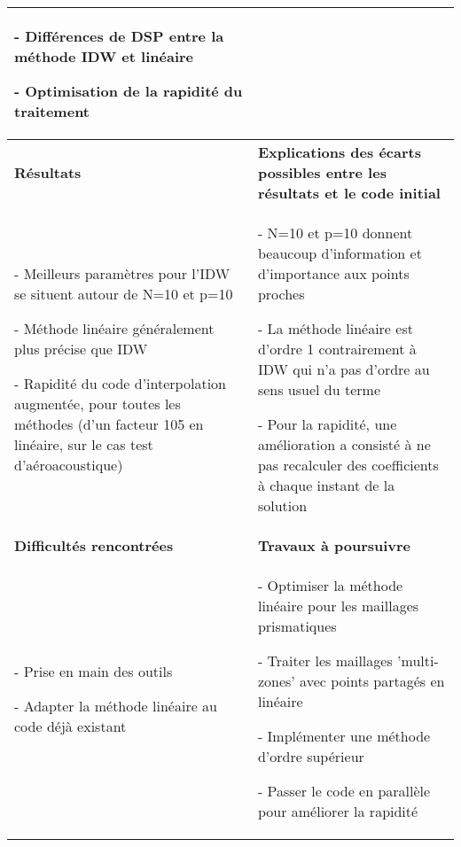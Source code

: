 \begin{table}[ht]
\begin{tabular}{|p{6.5cm}|p{8.5cm}|}
{\begin{minipage}[t]{14cm}
- Différences de DSP entre la méthode IDW et linéaire

- Optimisation de la rapidité du traitement
\hspace{0.5cm}
\end{minipage}
} \\ 
\hline
\textbf{Résultats} & \textbf{Explications des écarts possibles entre les résultats et le code initial} \\ 
\hline
\begin{minipage}[t]{6.5cm}

- Meilleurs paramètres pour l'IDW se situent autour de N=10 et p=10

- Méthode linéaire généralement plus précise que IDW

- Rapidité du code d'interpolation augmentée, pour toutes les méthodes (d'un facteur 105 en linéaire, sur le cas test d'aéroacoustique)

\end{minipage} & 
\begin{minipage}[t]{8.5cm}

- N=10 et p=10 donnent beaucoup d'information et d'importance aux points proches

- La méthode linéaire est d'ordre 1 contrairement à IDW qui n'a pas d'ordre au sens usuel du terme

- Pour la rapidité, une amélioration a consisté à ne pas recalculer des coefficients à chaque instant de la solution

\end{minipage} \\ 
\hline
\textbf{Difficultés rencontrées} & \textbf{Travaux à poursuivre} \\ 
\hline
\begin{minipage}[t]{6.5cm}
- Prise en main des outils

- Adapter la méthode linéaire au code déjà existant
\end{minipage} & 
\begin{minipage}[t]{8.5cm}
- Optimiser la méthode linéaire pour les maillages prismatiques

- Traiter les maillages 'multi-zones' avec points partagés en linéaire

- Implémenter une méthode d'ordre supérieur

- Passer le code en parallèle pour améliorer la rapidité


\end{minipage} \\ 
\hline
\end{tabular}
\end{table}  
\newpage
